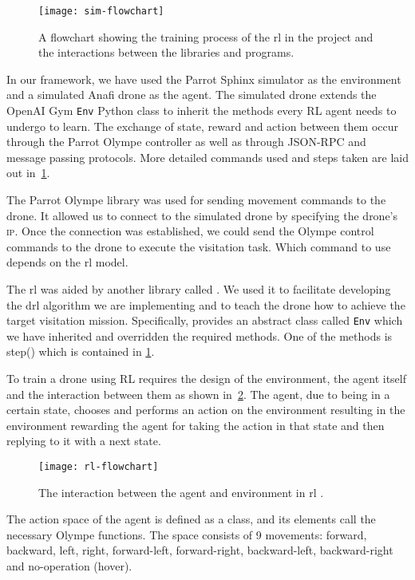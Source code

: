 \documentclass[../main.tex]{subfiles}
\begin{document}
\begin{figure}[p]
    \centering
    \texttt{[image: sim-flowchart]}
    \caption{A flowchart showing the training process
        of the \gls{rl} in the project
        and the interactions between the libraries
        and programs.}
    \label{fig:sim-flowchart}
\end{figure}

In our framework, we have used the Parrot Sphinx simulator
as the environment and a simulated Anafi drone as the agent.
The simulated drone extends the OpenAI Gym \texttt{Env} 
Python class
to inherit the methods every RL agent
needs to undergo to learn.
The exchange of state, reward and action between them 
occur through the Parrot Olympe controller as well as
through JSON-RPC and message passing protocols.
More detailed commands used and steps taken are laid out 
in~\cref{fig:sim-flowchart}.

The Parrot Olympe library was used for sending movement commands to
the drone.
It allowed us to connect
to the simulated drone by specifying the drone's
\textsc{ip}. Once the connection was established, 
we could send the Olympe control commands to the drone
to execute the visitation task. 
Which command to use
depends on the \gls{rl} model.

The \gls{rl} was aided 
by another library called \gym.
We used it to facilitate developing the
\gls{drl} algorithm we are implementing and to 
teach the drone how to achieve the 
target visitation mission.
Specifically, \gym provides an abstract class 
called \texttt{Env}
which we have inherited and overridden the 
required methods.
One of the methods is step() which is contained in
\cref{fig:sim-flowchart}.

To train a drone using RL requires the
design of the environment, the agent itself and
the interaction between them as shown in~\cref{fig:rl}. 
The agent, due to being in a certain state, chooses and 
performs an action on
the environment resulting in the environment 
rewarding the agent for taking the action in that state
and then replying to it with a next state.

\begin{figure}[!t]
	\centering
	\texttt{[image: rl-flowchart]}
	\caption{The interaction between the agent and environment
        in \gls{rl} \cite{Sut20}.}
	\label{fig:rl}
\end{figure}

The action space of the agent is defined as a class, and its
elements call the necessary Olympe functions. 
The space consists of 9 movements: 
forward, backward, left,
right, forward-left, forward-right, backward-left,
backward-right and no-operation (hover).
\end{document}
